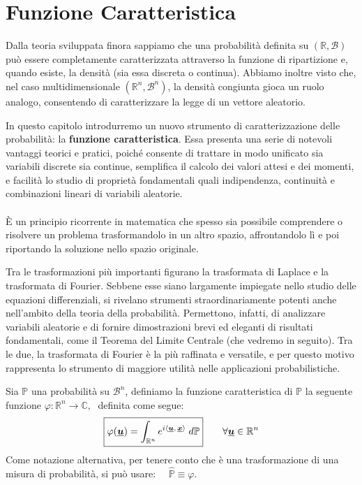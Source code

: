 \chapter{Funzione Caratteristica}

Dalla teoria sviluppata finora sappiamo che una probabilità definita su 
$(\mathbb{R}, \mathcal{B})$ può essere completamente caratterizzata attraverso la 
funzione di ripartizione e, quando esiste, la densità (sia essa discreta o continua). Abbiamo inoltre visto che, nel caso multidimensionale $(\mathbb{R}^n, \mathcal{B}^n)$, la densità congiunta gioca un ruolo analogo, consentendo di caratterizzare la legge di un vettore aleatorio.

\medskip
\noindent
In questo capitolo introdurremo un nuovo strumento di caratterizzazione delle probabilità: la \textbf{funzione caratteristica}. Essa presenta una serie di notevoli vantaggi teorici e pratici, poiché consente di trattare in modo unificato sia variabili discrete sia continue, semplifica il calcolo dei valori attesi e dei momenti, e facilità lo studio di proprietà fondamentali quali indipendenza, continuità e combinazioni lineari di variabili aleatorie.\\
\\
È un principio ricorrente in matematica che spesso sia possibile comprendere o risolvere un problema trasformandolo in un altro spazio, affrontandolo lì e poi riportando la soluzione nello spazio originale.

\medskip
Tra le trasformazioni più importanti figurano la trasformata di Laplace e la trasformata di Fourier. Sebbene esse siano largamente impiegate nello studio delle equazioni differenziali, si rivelano strumenti straordinariamente potenti anche nell’ambito della teoria della probabilità. Permettono, infatti, di analizzare variabili aleatorie e di fornire dimostrazioni brevi ed eleganti di risultati fondamentali, come il Teorema del Limite Centrale (che vedremo in seguito). Tra le due, la trasformata di Fourier è la più raffinata e versatile, e per questo motivo rappresenta lo strumento di maggiore utilità nelle applicazioni probabilistiche.

\begin{definizione}
    Sia $\mathbb{P}$ una probabilità su $\mathcal{B}^n$, definiamo la funzione caratteristica di $\mathbb{P}$ la seguente funzione $\varphi:\mathbb{R}^n\to\mathbb{C}, \;$ definita come segue:
    \[\boxed{\varphi(\underline{{\boldsymbol{u}}}) = \int_{\mathbb{R}^n}e^{i\left\langle \underline{{\boldsymbol{u}}},\, \underline{{\boldsymbol{x}}} \right\rangle}\;d\mathbb{P}}\qquad \forall \underline{{\boldsymbol{u}}}\in\mathbb{R}^n\]
    Come notazione alternativa, per tenere conto che è una trasformazione di una misura di probabilità, si può usare: $\quad \widehat{\mathbb{P}}\equiv \varphi$.
\end{definizione}


